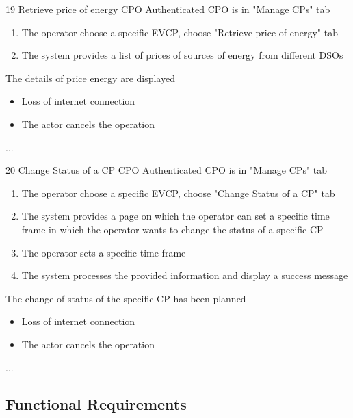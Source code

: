 \usecase
{19}
{Retrieve price of energy} %
{CPO} %
{Authenticated CPO is in "Manage CPs" tab} %
{ %
    \begin{enumerate}
        \item The operator choose a specific EVCP, choose "Retrieve price of energy" tab
        \item The system provides a list of prices of sources of energy from different DSOs
    \end{enumerate}
}
{The details of price energy are displayed} %
{ %
    \begin{itemize}
        \item Loss of internet connection
        \item The actor cancels the operation
    \end{itemize}
}
{ %
    ...
}

\usecase
{20}
{Change Status of a CP} %
{CPO} %
{Authenticated CPO is in "Manage CPs" tab} %
{ %
    \begin{enumerate}
        \item The operator choose a specific EVCP, choose "Change Status of a CP" tab
        \item The system provides a page on which the operator can set a specific time frame in which the operator wants to change the status of a specific CP
        \item The operator sets a specific time frame
        \item The system processes the provided information and display a success message
    \end{enumerate}
}
{The change of status of the specific CP has been planned} %
{ %
    \begin{itemize}
        \item Loss of internet connection
        \item The actor cancels the operation
    \end{itemize}
}
{ %
    ...
}

\subsection{Functional Requirements}


